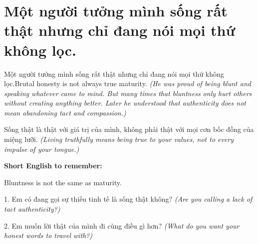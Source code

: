 \section{Một người tưởng mình sống rất thật nhưng chỉ đang nói mọi thứ không lọc.}
\begin{truyen}{Một người tưởng mình sống rất thật nhưng chỉ đang nói mọi thứ không lọc.}{Brutal honesty is not always true maturity.}
\textit{(He was proud of being blunt and speaking whatever came to mind. But many times that bluntness only hurt others without creating anything better. Later he understood that authenticity does not mean abandoning tact and compassion.)}
\end{truyen}
\begin{baihoc}
Sống thật là thật với giá trị của mình, không phải thật với mọi cơn bốc đồng của miệng lưỡi.
\textit{(Living truthfully means being true to your values, not to every impulse of your tongue.)}
\end{baihoc}
\begin{ghinhoanh}
\textbf{Short English to remember:}

Bluntness is not the same as maturity.
\end{ghinhoanh}
\begin{tuhocnhanh}
1. Em có đang gọi sự thiếu tinh tế là sống thật không? \textit{(Are you calling a lack of tact authenticity?)}

2. Em muốn lời thật của mình đi cùng điều gì hơn? \textit{(What do you want your honest words to travel with?)}
\end{tuhocnhanh}
\ngancach